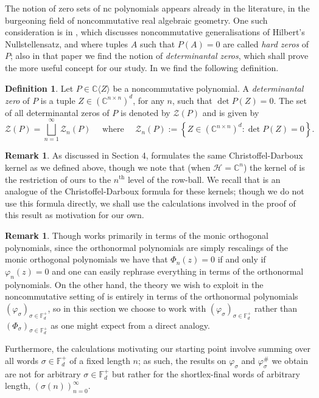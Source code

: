 \documentclass[11pt,reqno]{amsart}
\def\p{\varphi}
\def\s{\sigma}
\def\P{\Phi}
\def\CC{\mathbb{C}}
\def\FF{\mathbb{F}}
\def\cH{\mathcal{H}}
\def\cZ{\mathcal{Z}}
\def\dju{\bigsqcup_{n=1}^{\infty}}
\theoremstyle{definition}
\newtheorem{definition}[theorem]{Definition}
\newtheorem{remark}[theorem]{Remark}
\numberwithin{equation}{section}
\begin{document}
The notion of zero sets of nc polynomials appears already in the literature, in the burgeoning field of noncommutative real algebraic geometry. One such consideration is in \cite{HKV22}, which discusses noncommutative generalisations of Hilbert's Nullstellensatz, and where tuples \(A\) such that \(P(A) = 0\) are called \emph{hard zeros} of \(P\); also in that paper we find the notion of \emph{determinantal zeros}, which shall prove the more useful concept for our study. In \cite{HKV22} we find the following definition.

\begin{definition}
    \label{def:DeterminantalZero}
    Let \(P\in \CC\langle Z \rangle\) be a noncommutative polynomial. A \emph{determinantal zero} of \(P\) is a tuple \(Z \in (\CC^{n\times n})^d\), for any \(n\), such that \(\det P(Z) = 0\). The set of all determinantal zeros of \(P\) is denoted by \(\cZ(P)\) and is given by
    \[
        \cZ(P) = \dju \cZ_n(P) \quad \text{ where } \quad \cZ_n(P) := \left\{Z \in (\CC^{n\times n})^d : \det P(Z) = 0\right\}.
    \]
\end{definition}

\begin{remark}
    As discussed in Section 4, \cite{CJ02b} formulates the same Christoffel-Darboux kernel as we defined above, though we note that (when \(\cH = \CC^n\)) the kernel of \cite{CJ02b} is the restriction of ours to the \(n^{\text{th}}\) level of the row-ball. We recall that \cite[Theorem 4.2]{CJ02b} is an analogue of the Christoffel-Darboux formula for these kernels; though we do not use this formula directly, we shall use the calculations involved in the proof of this result as motivation for our own.
\end{remark}

\begin{remark}
    Though \cite{Sim05} works primarily in terms of the monic orthogonal polynomials, since the orthonormal polynomials are simply rescalings of the monic orthogonal polynomials we have that \(\P_n(z) = 0\) if and only if \(\p_n(z) = 0\) and one can easily rephrase everything in terms of the orthonormal polynomials. On the other hand, the theory we wish to exploit in the noncommutative setting of \cite{CJ02b} is entirely in terms of the orthonormal polynomials \((\p_\s)_{\s \in \FF_d^+}\), so in this section we choose to work with \((\p_\s)_{\s \in \FF_d^+}\) rather than \((\P_\s)_{\s \in \FF_d^+}\) as one might expect from a direct analogy.

    Furthermore, the calculations motivating our starting point involve summing over all words \(\s \in \FF_d^+\) of a fixed length \(n\); as such, the results on \(\p_\s\) and \(\p_\s^{\#}\) we obtain are not for arbitrary \(\s \in \FF_d^+\) but rather for the shortlex-final words of arbitrary length, \((\s(n))_{n=0}^{\infty}\).
\end{remark}
\end{document}
